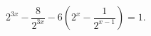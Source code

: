 \begin{ex}[type=equation]
	\begin{condition}
		$2^{3x} - \dfrac{8}{2^{3x}} - 6\left(2^x - \dfrac{1}{2^{x - 1}}\right) = 1 .$
	\end{condition}
\end{ex}